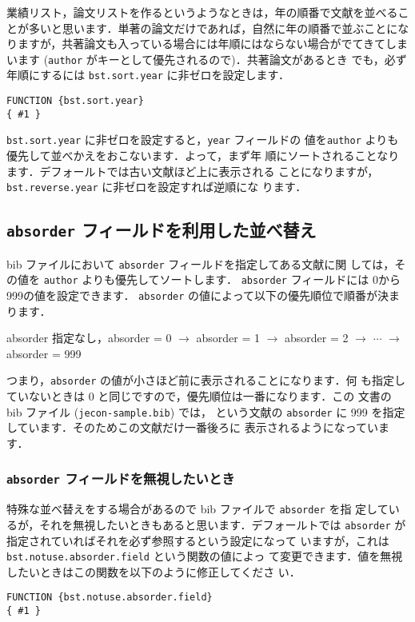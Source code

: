 \documentclass[a4j,10pt]{jarticle}
\begin{document}
業績リスト，論文リストを作るというようなときは，年の順番で文献を並べるこ
とが多いと思います．単著の論文だけであれば，自然に年の順番で並ぶことにな
りますが，共著論文も入っている場合には年順にはならない場合がでてきてしま
います (\texttt{author} がキーとして優先されるので)．共著論文があるとき
でも，必ず年順にするには \texttt{bst.sort.year} に非ゼロを設定します．
\begin{screen}
\begin{verbatim}
FUNCTION {bst.sort.year}
{ #1 }
\end{verbatim}
\end{screen}
\texttt{bst.sort.year} に非ゼロを設定すると，\texttt{year} フィールドの
値を\texttt{author} よりも優先して並べかえをおこないます．よって，まず年
順にソートされることなります．デフォールトでは古い文献ほど上に表示される
ことになりますが，\texttt{bst.reverse.year} に非ゼロを設定すれば逆順にな
ります．


\subsection{\texttt{absorder} フィールドを利用した並べ替え}

bib ファイルにおいて \texttt{absorder} フィールドを指定してある文献に関
しては，その値を \texttt{author} よりも優先してソートします．
\texttt{absorder} フィールドには 0から999の値を設定できます．
\texttt{absorder} の値によって以下の優先順位で順番が決まります．

\begin{screen}
 \begin{center}
 absorder 指定なし，absorder = 0  $\rightarrow$ absorder = 1 $\rightarrow$ absorder = 2
 $\rightarrow$ $\cdots$ $\rightarrow$ absorder = 999
 \end{center}
\end{screen}

つまり，\texttt{absorder} の値が小さほど前に表示されることになります．何
も指定していないときは 0 と同じですので，優先順位は一番になります．この
文書の bib ファイル (\texttt{jecon-sample.bib}) では，
\citet{takeda06:_cge_analy_welfar_effec_trade} という文献の
\texttt{absorder} に 999 を指定しています．そのためこの文献だけ一番後ろに
表示されるようになっています．


\subsubsection{\texttt{absorder} フィールドを無視したいとき}

特殊な並べ替えをする場合があるので bib ファイルで \texttt{absorder} を指
定しているが，それを無視したいときもあると思います．デフォールトでは 
\texttt{absorder} が指定されていればそれを必ず参照するという設定になって
いますが，これは \texttt{bst.notuse.absorder.field} という関数の値によっ
て変更できます．値を無視したいときはこの関数を以下のように修正してくださ
い．
\begin{screen}
\begin{verbatim}
FUNCTION {bst.notuse.absorder.field}
{ #1 }
\end{verbatim}
\end{screen}
\end{document}
